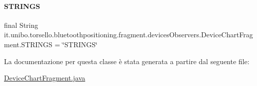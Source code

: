 \paragraph{\texorpdfstring{S\+T\+R\+I\+N\+GS}{STRINGS}}
{\footnotesize\ttfamily final String it.\+unibo.\+torsello.\+bluetoothpositioning.\+fragment.\+devices\+Observers.\+Device\+Chart\+Fragment.\+S\+T\+R\+I\+N\+GS = \char`\"{}S\+T\+R\+I\+N\+GS\char`\"{}\hspace{0.3cm}{\ttfamily [static]}}



La documentazione per questa classe è stata generata a partire dal seguente file\+:\begin{DoxyCompactItemize}
\item 
\hyperlink{DeviceChartFragment_8java}{Device\+Chart\+Fragment.\+java}\end{DoxyCompactItemize}
